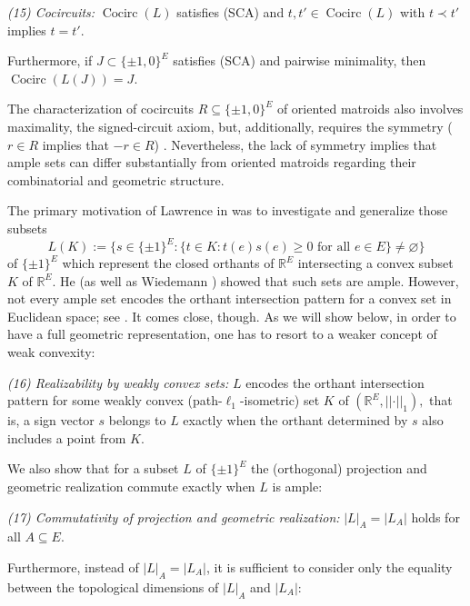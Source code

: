 \documentclass[11pt,a4paper]{amsart}
\theoremstyle{definition}
\numberwithin{equation}{section}
\DeclareMathOperator{\Cocirc}{Cocirc}
\newcommand{\covectors}{\ensuremath{L}}
\newcommand{\RR}{\ensuremath{R}}
\newcommand{\hcovectors}{J}
\begin{document}
\medskip\noindent
{\it {\rm(15)} Cocircuits:}   $\Cocirc(\covectors)$ satisfies (SCA) and $t,t'\in \Cocirc(\covectors)$ with $t\prec t'$ implies $t=t'$.

\medskip
Furthermore, if $\hcovectors\subset \{ \pm 1,0\}^E$ satisfies (SCA) and pairwise minimality, then $\Cocirc(\covectors(\hcovectors))=\hcovectors$.


The
characterization of cocircuits ${\RR}\subseteq  \{ \pm 1,0\}^E$ of
oriented matroids also involves maximality, the signed-circuit
axiom, but, additionally, requires  the symmetry ($r\in {\RR}$ implies that
$-r\in {\RR}$) \cite{BjLVStWhZi}. Nevertheless, the lack of symmetry implies that ample sets can differ
substantially from oriented matroids regarding their combinatorial and geometric structure.



\medskip
The primary motivation of
Lawrence in  \cite{La} was to investigate and generalize
those subsets
$${\covectors}(K) := \{ s \in \{ \pm 1\}^E:
\{ t \in K: t(e)s(e) \geq 0 \mbox{ for all } e \in E\} \neq
\varnothing \}$$ of $\{ \pm 1\}^E$ which represent the closed orthants of ${\mathbb R}^E$
intersecting a convex subset $K$ of ${\mathbb R}^E$. He (as well as Wiedemann \cite{Wi}) showed that such sets
 are ample.  However,  not every ample set encodes
the orthant intersection pattern for a convex set in Euclidean
space; see \cite{La}. It comes close, though. As we  will show below, in order
to have a full geometric representation, one has to resort to a
weaker concept of weak convexity:

\medskip\noindent
{\it {\rm(16)} Realizability by weakly convex sets:} $\covectors$  encodes the orthant
intersection pattern for some weakly convex (path-$\ell_1$-isometric) set $K$ of
$({\mathbb R}^E,\vert\vert\cdot\vert\vert_1),$ that is, a sign
vector $s$ belongs to $\covectors$ exactly when the orthant determined by $s$
also includes a point from $K.$

\medskip
We also show that for a subset $\covectors$ of $\{ \pm 1\}^E$ the  (orthogonal) projection and geometric
realization commute exactly when $\covectors$ is ample:

\medskip\noindent
{\it {\rm(17)} Commutativity of projection and geometric realization:} $|{\covectors}|_A=|{\covectors}_A|$ holds for all $A\subseteq E$.

\medskip
Furthermore, instead of $|{\covectors}|_A=|{\covectors}_A|$, it is sufficient to consider only the equality between the topological dimensions of  $|{\covectors}|_A$ and $|{\covectors}_A|$:
\end{document}
